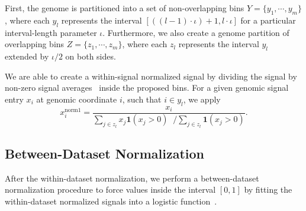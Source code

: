 First, the genome is partitioned into a set of non-overlapping bins ${Y} = \{ {y}_{1}, \cdots, {y}_{m} \}$, where each ${y}_{l}$ represents the interval $[((l-1) \cdot \iota )+1, l \cdot \iota]$ for a particular interval-length parameter $\iota$. Furthermore, we also create a genome partition of overlapping bins ${Z} = \{ {z}_{1}, \cdots, {z}_{m} \}$, where each ${z}_{l}$ represents the interval ${y}_{l}$ extended by $\iota/2$ on both sides.

We are able to create a within-signal normalized signal by dividing the signal by non-zero signal averages~\citep{boyle2011} inside the proposed bins. For a given genomic signal entry $x_i$ at genomic coordinate $i$, such that $i \in {y}_{l}$, we apply
\begin{equation}
  \label{eq:signal.within.norm}
  {x}^{\text{norm1}}_{i} = \frac{{x}_{i}}{ 
                     \sum\limits_{j \in {z}_{l}} {x}_{j} \mathbf{1}({x}_{j} > 0)  \;\; \Big/  
                     \sum\limits_{j \in {z}_{l}} \mathbf{1}({x}_{j} > 0)
                     }.
\end{equation}

\subsection{Between-Dataset Normalization}
\label{sec:betweendataset.normalization}

After the within-dataset normalization, we perform a between-dataset normalization procedure to force values inside the interval $ [0,1] $ by fitting the within-dataset normalized signals into a logistic function~\citep{hon2009}.

